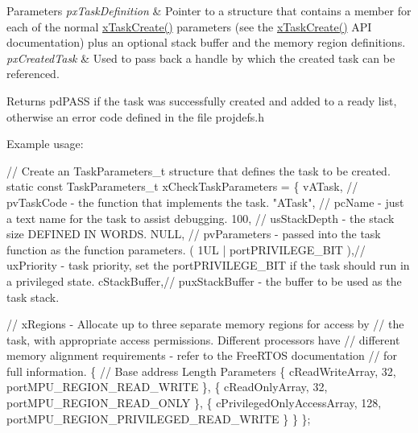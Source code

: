 \begin{DoxyParams}{Parameters}
{\em px\+Task\+Definition} & Pointer to a structure that contains a member for each of the normal \hyperlink{vendor_2ceedling_2plugins_2freertos_2src_2freertos_2include_2task_8h_adf67e7cd0bfd1eda9e8afd048206f7c2}{x\+Task\+Create()} parameters (see the \hyperlink{vendor_2ceedling_2plugins_2freertos_2src_2freertos_2include_2task_8h_adf67e7cd0bfd1eda9e8afd048206f7c2}{x\+Task\+Create()} A\+PI documentation) plus an optional stack buffer and the memory region definitions.\\
\hline
{\em px\+Created\+Task} & Used to pass back a handle by which the created task can be referenced.\\
\hline
\end{DoxyParams}
\begin{DoxyReturn}{Returns}
pd\+P\+A\+SS if the task was successfully created and added to a ready list, otherwise an error code defined in the file projdefs.\+h
\end{DoxyReturn}
Example usage\+: 
\begin{DoxyPre}
// Create an TaskParameters\_t structure that defines the task to be created.
static const TaskParameters\_t xCheckTaskParameters =
\{
 vATask,     // pvTaskCode - the function that implements the task.
 "ATask",    // pcName - just a text name for the task to assist debugging.
 100,        // usStackDepth - the stack size DEFINED IN WORDS.
 NULL,       // pvParameters - passed into the task function as the function parameters.
 ( 1UL | portPRIVILEGE\_BIT ),// uxPriority - task priority, set the portPRIVILEGE\_BIT if the task should run in a privileged state.
 cStackBuffer,// puxStackBuffer - the buffer to be used as the task stack.\end{DoxyPre}



\begin{DoxyPre} // xRegions - Allocate up to three separate memory regions for access by
 // the task, with appropriate access permissions.  Different processors have
 // different memory alignment requirements - refer to the FreeRTOS documentation
 // for full information.
 \{
     // Base address                 Length  Parameters
     \{ cReadWriteArray,              32,     portMPU\_REGION\_READ\_WRITE \},
     \{ cReadOnlyArray,               32,     portMPU\_REGION\_READ\_ONLY \},
     \{ cPrivilegedOnlyAccessArray,   128,    portMPU\_REGION\_PRIVILEGED\_READ\_WRITE \}
 \}
\};\end{DoxyPre}



